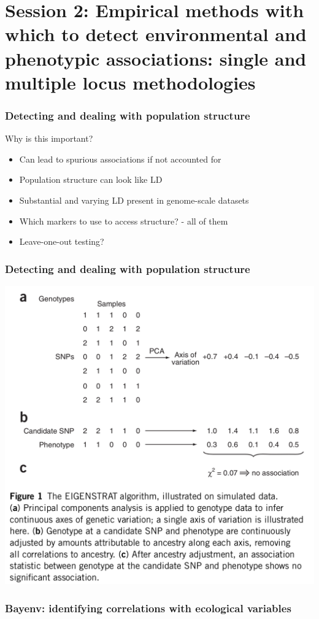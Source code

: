 
\section[Session 2]{Session 2: Empirical methods with which to detect
environmental and phenotypic associations: single and multiple locus
methodologies}

\begin{frame}
\frametitle{Detecting and dealing with population structure}
\begin{block}{Why is this important?}
\begin{itemize}
	\item{Can lead to spurious associations if not accounted for}
	\item{Population structure can look like LD}
	\item{Substantial and varying LD present in genome-scale datasets}
	\item{Which markers to use to access structure? - all of them}
	\item{Leave-one-out testing?}
\end{itemize}
\end{block}
\tiny
\citet{Price:2006cd}
\end{frame}

\begin{frame}
\frametitle{Detecting and dealing with population structure}
\begin{block}{}
\centering
\includegraphics[height=0.8\textheight]{price.png}\\
\tiny
\citet[Figure 1]{Price:2006cd}
\end{block}
\end{frame}

\begin{frame}
\frametitle{Bayenv: identifying correlations with ecological variables}
\end{frame}